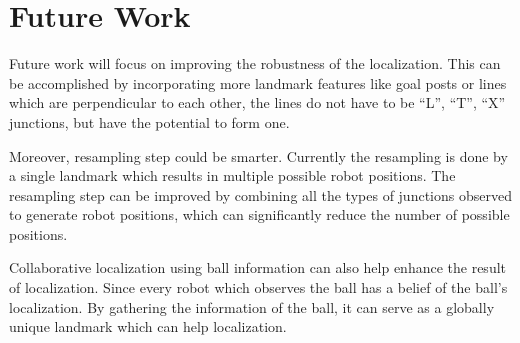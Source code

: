 \section{Future Work\label{sec:future}}
Future work will focus on improving the robustness of the localization. This can be accomplished by incorporating more landmark features like goal posts or lines which are perpendicular to each other, the lines do not have to be ``L'', ``T'', ``X'' junctions, but have the potential to form one.  

Moreover, resampling step could be smarter. Currently the resampling is done by a single landmark which results in multiple possible robot positions. The resampling step can be improved by combining all the types of junctions observed to generate robot positions, which can significantly reduce the number of possible positions.

Collaborative localization using ball information can also help enhance the result of localization. Since every robot which observes the ball has a belief of the ball's localization. By gathering the information of the ball, it can serve as a globally unique landmark which can help localization.


